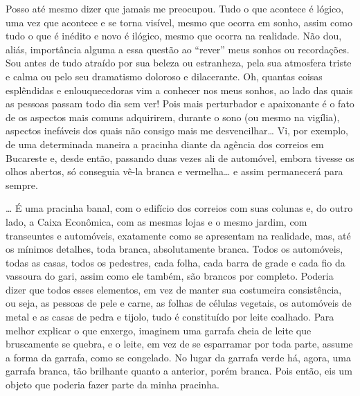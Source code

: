 Posso até mesmo dizer que jamais me preocupou. Tudo o que acontece é
lógico, uma vez que acontece e se torna visível, mesmo que ocorra em
sonho, assim como tudo o que é inédito e novo é ilógico, mesmo que
ocorra na realidade. Não dou, aliás, importância alguma a essa questão
ao ``rever'' meus sonhos ou recordações. Sou antes de tudo atraído por
sua beleza ou estranheza, pela sua atmosfera triste e calma ou pelo seu
dramatismo doloroso e dilacerante. Oh, quantas coisas esplêndidas e
enlouquecedoras vim a conhecer nos meus sonhos, ao lado das quais as
pessoas passam todo dia sem ver! Pois mais perturbador e apaixonante é o
fato de os aspectos mais comuns adquirirem, durante o sono (ou mesmo
na vigília), aspectos inefáveis dos quais não consigo mais me
desvencilhar\ldots{} Vi, por exemplo, de uma determinada maneira a
pracinha diante da agência dos correios em Bucareste e, desde então,
passando duas vezes ali de automóvel, embora tivesse os olhos abertos,
só conseguia vê-la branca e vermelha\ldots{} e assim permanecerá para
sempre.

\ldots{} É uma pracinha banal, com o edifício dos correios com suas
colunas e, do outro lado, a Caixa Econômica, com as mesmas lojas e o
mesmo jardim, com transeuntes e automóveis, exatamente como se
apresentam na realidade, mas, até os mínimos detalhes, toda branca,
absolutamente branca. Todos os automóveis, todas as casas, todos os
pedestres, cada folha, cada barra de grade e cada fio da vassoura do
gari, assim como ele também, são brancos por completo. Poderia dizer que
todos esses elementos, em vez de manter sua costumeira consistência, ou
seja, as pessoas de pele e carne, as folhas de células vegetais, os
automóveis de metal e as casas de pedra e tijolo, tudo é constituído por
leite coalhado. Para melhor explicar o que enxergo, imaginem uma garrafa
cheia de leite que bruscamente se quebra, e o leite, em vez de se
esparramar por toda parte, assume a forma da garrafa, como se congelado.
No lugar da garrafa verde há, agora, uma garrafa branca, tão brilhante
quanto a anterior, porém branca. Pois então, eis um objeto que poderia
fazer parte da minha pracinha.

